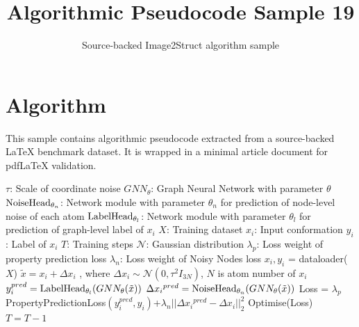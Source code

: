 \documentclass[11pt]{article}
\title{Algorithmic Pseudocode Sample 19}
\author{Source-backed Image2Struct algorithm sample}
\date{}
\begin{document}
\maketitle
\section{Algorithm}
This sample contains algorithmic pseudocode extracted from a source-backed LaTeX benchmark dataset. It is wrapped in a minimal article document for pdfLaTeX validation.

\begin{algorithm}[htbp]
\caption{Source-backed algorithmic procedure}
\begin{algorithm}
[htbp]
\caption{Noisy Nodes algorithm}\begin{algorithmic}[1]
\Require
\Statex$\tau$: Scale of coordinate noise
\Statex$GNN_{\theta}$: Graph Neural Network with parameter $\theta$
\Statex ${\rm NoiseHead}_{\theta_{n}}$: Network module with parameter $\theta_{n}$ for prediction of node-level noise of each atom
\Statex ${\rm LabelHead}_{\theta_{l}}$: Network module with parameter $\theta_{l}$ for prediction of graph-level label of $x_{i}$
\Statex$X$: Training dataset
\Statex$x_i$: Input conformation
\Statex$y_i$: Label of $x_i$
\Statex$T$: Training steps
\Statex$\mathcal N$: Gaussian distribution
\Statex$\lambda_{p}$: Loss weight of property prediction loss
\Statex$\lambda_{n}$: Loss weight of Noisy Nodes loss
\State $x_i, y_i$ = dataloader($X$) 
\State $\tilde{x} = x_{i} + \Delta{x_i}$ , where $\Delta{x_i} \sim \mathcal{N}(0, {\tau}^2I_{3N})$, $N$ is atom number of $x_i$
\State $y_{i}^{pred}={\rm LabelHead}_{\theta_{l}}(GNN_{\theta}(\tilde{x}))$
\State $\Delta{x_i}^{pred}={\rm NoiseHead}_{\theta_{n}}(GNN_{\theta}(\tilde{x}))$
\State Loss = $\lambda_{p}$PropertyPredictionLoss$(y_{i}^{pred}, y_i)$+$\lambda_{n}||\Delta{x_i}^{pred} - \Delta{x_i}||_{2}^{2}$
\State Optimise(Loss)
\State $T = T - 1$
\EndWhile
\end{algorithmic}
\end{algorithm}
\end{algorithm}
\end{document}

